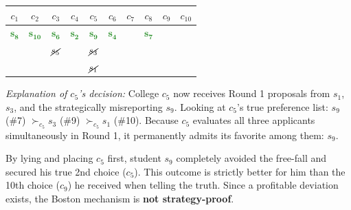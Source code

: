 {\begin{center}
\renewcommand{\arraystretch}{1.2}
\begin{tabular}{cccccccccc}
    $c_1$ & $c_2$ & $c_3$ & $c_4$ & $c_5$ & $c_6$ & $c_7$ & $c_8$ & $c_9$ & $c_{10}$ \\
    \hline
    \textcolor{ForestGreen}{$\mathbf{s_8}$} & \textcolor{ForestGreen}{$\mathbf{s_{10}}$} & \textcolor{ForestGreen}{$\mathbf{s_6}$} & \textcolor{ForestGreen}{$\mathbf{s_2}$} & \textcolor{ForestGreen}{$\mathbf{s_9}$} & \textcolor{ForestGreen}{$\mathbf{s_4}$} & & \textcolor{ForestGreen}{$\mathbf{s_7}$} & & \\
     & & $\cancel{s_5}$ & & $\cancel{s_3}$ & & & & & \\
     & & & & $\cancel{s_1}$ & & & & & \\
\end{tabular}
\end{center}
  
  \textit{Explanation of $c_5$'s decision:} 
  College $c_5$ now receives Round 1 proposals from $s_1$, $s_3$, and the strategically misreporting $s_9$. 
  Looking at $c_5$'s true preference list: $s_9$ (\#7) $\succ_{c_5} s_3$ (\#9) $\succ_{c_5} s_1$ (\#10). 
  Because $c_5$ evaluates all three applicants simultaneously in Round 1, it permanently admits its favorite among them: \textbf{$s_9$}.

  \medskip
  \noindent By lying and placing $c_5$ first, student $s_9$ completely avoided the free-fall and secured his true 2nd choice ($c_5$). This outcome is strictly better for him than the 10th choice ($c_9$) he received when telling the truth. Since a profitable deviation exists, the Boston mechanism is \textbf{not strategy-proof}.
}


